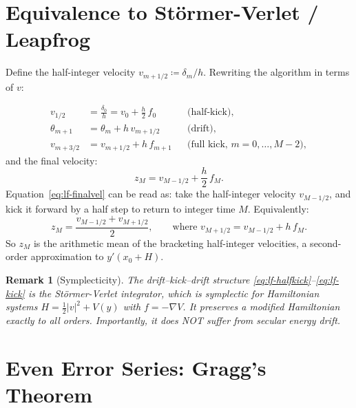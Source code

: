 \documentclass[11pt]{article}
\newtheorem{remark}{Remark}
\begin{document}
\section{Equivalence to Störmer-Verlet / Leapfrog}

Define the half-integer velocity $v_{m+1/2} \coloneqq \delta_m / h$.  Rewriting the
algorithm in terms of $v$:

\begin{align}
  v_{1/2}       &= \frac{\delta_0}{h} = v_0 + \frac{h}{2}\, f_0
                   && \text{(half-kick)}, \label{eq:lf-halfkick} \\[4pt]
  \theta_{m+1}  &= \theta_m + h\, v_{m+1/2}
                   && \text{(drift)}, \label{eq:lf-drift} \\[4pt]
  v_{m+3/2}     &= v_{m+1/2} + h\, f_{m+1}
                   && \text{(full kick, } m = 0, \ldots, M-2\text{)}, \label{eq:lf-kick}
\end{align}
and the final velocity:
\begin{equation}
  \label{eq:lf-finalvel}
  z_M = v_{M-1/2} + \frac{h}{2}\, f_M.
\end{equation}
Equation~\eqref{eq:lf-finalvel} can be read as: take the half-integer velocity
$v_{M-1/2}$, and kick it forward by a half step to return to integer time $M$.
Equivalently:
\begin{equation}
  z_M = \frac{v_{M-1/2} + v_{M+1/2}}{2},
  \qquad \text{where } v_{M+1/2} = v_{M-1/2} + h\, f_M.
\end{equation}
So $z_M$ is the arithmetic mean of the bracketing half-integer velocities, a
second-order approximation to $y'(x_0 + H)$.

\begin{remark}[Symplecticity]
  The drift–kick–drift structure \eqref{eq:lf-halfkick}--\eqref{eq:lf-kick} is
  the \emph{Störmer-Verlet} integrator, which is \emph{symplectic} for Hamiltonian
  systems $H = \tfrac12 |v|^2 + V(y)$ with $f = -\nabla V$.  It preserves a
  modified Hamiltonian exactly to all orders.  Importantly, it does NOT suffer from
  secular energy drift.
\end{remark}

\section{Even Error Series: Gragg's Theorem}
\end{document}
